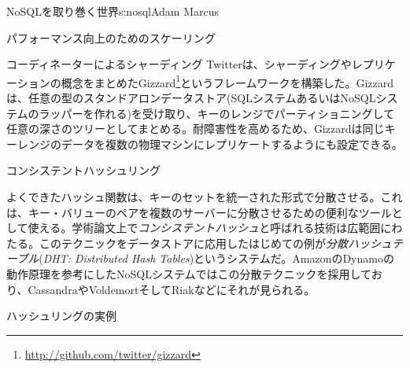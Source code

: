 \begin{aosachapter}{NoSQLを取り巻く世界}{s:nosql}{Adam Marcus}
\begin{aosasect1}{パフォーマンス向上のためのスケーリング}
\begin{aosasect2}{コーディネーターによるシャーディング}
Twitterは、シャーディングやレプリケーションの概念をまとめたGizzard\footnote{\url{http://github.com/twitter/gizzard}}というフレームワークを構築した。Gizzardは、任意の型のスタンドアロンデータストア(SQLシステムあるいはNoSQLシステムのラッパーを作れる)を受け取り、キーのレンジでパーティショニングして任意の深さのツリーとしてまとめる。耐障害性を高めるため、Gizzardは同じキーレンジのデータを複数の物理マシンにレプリケートするようにも設定できる。

\end{aosasect2}

\begin{aosasect2}{コンシステントハッシュリング}

よくできたハッシュ関数は、キーのセットを統一された形式で分散させる。これは、キー・バリューのペアを複数のサーバーに分散させるための便利なツールとして使える。学術論文上で\emph{コンシステントハッシュ}と呼ばれる技術は広範囲にわたる。このテクニックをデータストアに応用したはじめての例が\emph{分散ハッシュテーブル}(\emph{DHT: Distributed Hash Tables})というシステムだ。AmazonのDynamoの動作原理を参考にしたNoSQLシステムではこの分散テクニックを採用しており、CassandraやVoldemortそしてRiakなどにそれが見られる。

\begin{aosasect3}{ハッシュリングの実例}



\end{aosasect3}
\end{aosasect2}
\end{aosasect1}
\end{aosachapter}

